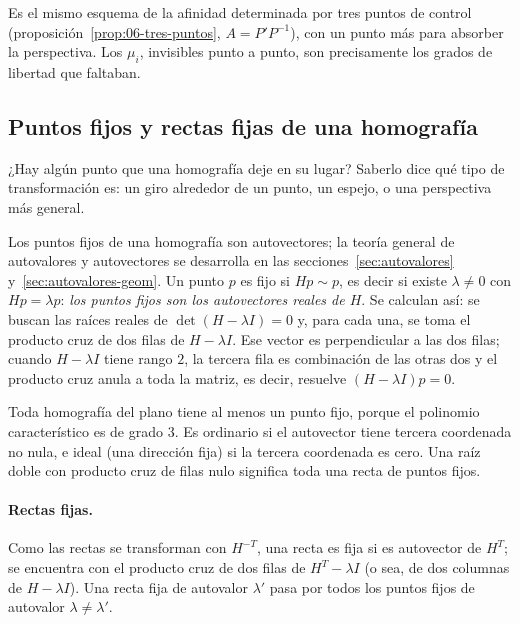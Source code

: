 Es el mismo esquema de la afinidad determinada por tres puntos de control
(proposición~\ref{prop:06-tres-puntos}, \(A=P'P^{-1}\)), con un punto más para absorber la
perspectiva. Los \(\mu_i\), invisibles punto a punto, son precisamente los
grados de libertad que faltaban.

\subsection{Puntos fijos y rectas fijas de una homografía}\label{sec:homografia-fijos}

¿Hay algún punto que una homografía deje en su lugar? Saberlo dice qué tipo de
transformación es: un giro alrededor de un punto, un espejo, o una perspectiva más general.

Los puntos fijos de una homografía son autovectores; la teoría general de autovalores y
autovectores se desarrolla en las secciones~\ref{sec:autovalores} y~\ref{sec:autovalores-geom}.
Un punto \(p\) es fijo si
\(Hp\sim p\), es decir si existe \(\lambda\neq0\) con \(Hp=\lambda p\): \emph{los puntos
fijos son los autovectores reales de \(H\)}. Se calculan así: se buscan las raíces reales de
\(\det(H-\lambda I)=0\) y, para cada una, se toma el producto cruz de dos filas de
\(H-\lambda I\). Ese vector es perpendicular a las dos filas; cuando \(H-\lambda I\) tiene
rango \(2\), la tercera fila es combinación de las otras dos y el producto cruz anula a toda
la matriz, es decir, resuelve \((H-\lambda I)p=0\).

\begin{resultado}
Toda homografía del plano tiene al menos un punto fijo, porque el polinomio característico
es de grado \(3\). Es ordinario si el autovector tiene tercera coordenada no nula, e ideal
(una dirección fija) si la tercera coordenada es cero. Una raíz doble con producto cruz de
filas nulo significa toda una recta de puntos fijos.
\end{resultado}

\paragraph{Rectas fijas.} Como las rectas se transforman con \(H^{-T}\), una recta es fija
si es autovector de \(H^{T}\); se encuentra con el producto cruz de dos filas de
\(H^{T}-\lambda I\) (o sea, de dos columnas de \(H-\lambda I\)). Una recta fija de autovalor
\(\lambda'\) pasa por todos los puntos fijos de autovalor \(\lambda\neq\lambda'\).

